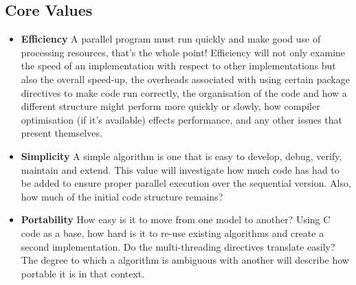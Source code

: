 \documentclass[11pt]{article} %
\begin{document}
\subsection{Core Values}
\begin{itemize}
\item {\bf Efficiency} A parallel program must run quickly and make good use of processing resources, that's the whole point! Efficiency will not only examine the speed of an implementation with respect to other implementations but also the overall speed-up, the overheads associated with using certain package directives to make code run correctly, the organisation of the code and how a different structure might perform more quickly or slowly, how compiler optimisation (if it's available) effects performance, and any other issues that present themselves.
\item {\bf Simplicity} A simple algorithm is one that is easy to develop, debug, verify, maintain and extend. This value will investigate how much code has had to be added to ensure proper parallel execution over the sequential version. Also, how much of the initial code structure remains? 
\item {\bf Portability} How easy is it to move from one model to another? Using C code as a base, how hard is it to re-use existing algorithms and create a second implementation. Do the multi-threading directives translate easily? The degree to which a algorithm is ambiguous with another will describe how portable it is in that context.

\end{itemize}
\end{document}
